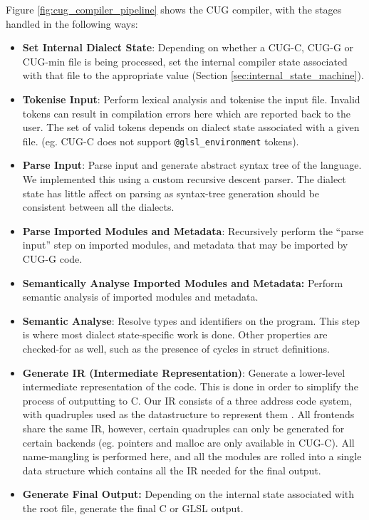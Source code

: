\documentclass[a4paper,12pt,twoside,openright]{report}
\begin{document}
Figure \ref{fig:cug_compiler_pipeline} shows the CUG compiler, with the
stages handled in the following ways:

\begin{itemize}

    \item \textbf{Set Internal Dialect State}: Depending on whether a CUG-C,
    CUG-G or CUG-min file is being processed, set the internal compiler state
    associated with that file to the appropriate value (Section
    \ref{sec:internal_state_machine}).

    \item \textbf{Tokenise Input}: Perform lexical analysis and tokenise the
    input file. Invalid tokens can result in compilation errors here which are
    reported back to the user. The set of valid tokens depends on dialect state
    associated with a given file. (eg. CUG-C does not support
    \texttt{@glsl\_environment} tokens).

    \item \textbf{Parse Input}: Parse input and generate abstract syntax tree
    of the language. We implemented this using a custom recursive descent
    parser. The dialect state has little affect on parsing as syntax-tree
    generation should be consistent between all the dialects.

    \item \textbf{Parse Imported Modules and Metadata}: Recursively perform the
    ``parse input'' step on imported modules, and metadata that may be imported
    by CUG-G code.

    \item \textbf{Semantically Analyse Imported Modules and Metadata:} Perform
    semantic analysis of imported modules and metadata.

    \item \textbf{Semantic Analyse}: Resolve types and identifiers on the
    program. This step is where most dialect state-specific work is done. Other
    properties are checked-for as well, such as the presence of cycles in
    struct definitions.

    \item \textbf{Generate IR (Intermediate Representation)}: Generate a
    lower-level intermediate representation of the code. This is done in order
    to simplify the process of outputting to C. Our IR consists of a three
    address code system, with quadruples used as the datastructure to represent
    them \cite{TODO}. All frontends share the same IR, however, certain
    quadruples can only be generated for certain backends (eg. pointers and
    malloc are only available in CUG-C). All name-mangling is performed here,
    and all the modules are rolled into a single data structure which contains
    all the IR needed for the final output.

    \item \textbf{Generate Final Output:} Depending on the internal state
    associated with the root file, generate the final C or GLSL output.

\end{itemize}
\end{document}
